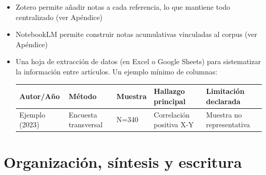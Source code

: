 \documentclass[
]{book}
\newcounter{none} %
\begin{document}
\begin{itemize}
\item
  Zotero permite añadir notas a cada referencia, lo que mantiene todo centralizado (ver Apéndice)
\item
  NotebookLM permite construir notas acumulativas vinculadas al corpus (ver Apéndice)
\item
  Una hoja de extracción de datos (en Excel o Google Sheets) para sistematizar la información entre artículos. Un ejemplo mínimo de columnas:

  {\def\LTcaptype{none} %
  \begin{longtable}[]{@{}
    >{\raggedright\arraybackslash}p{}
    >{\raggedright\arraybackslash}p{}
    >{\raggedright\arraybackslash}p{}
    >{\raggedright\arraybackslash}p{}
    >{\raggedright\arraybackslash}p{}@{}}
  \toprule\noalign{}
  \begin{minipage}[b]{\linewidth}\raggedright
  Autor/Año
  \end{minipage} & \begin{minipage}[b]{\linewidth}\raggedright
  Método
  \end{minipage} & \begin{minipage}[b]{\linewidth}\raggedright
  Muestra
  \end{minipage} & \begin{minipage}[b]{\linewidth}\raggedright
  Hallazgo principal
  \end{minipage} & \begin{minipage}[b]{\linewidth}\raggedright
  Limitación declarada
  \end{minipage} \\
  \midrule\noalign{}
  \endhead
  \bottomrule\noalign{}
  \endlastfoot
  Ejemplo (2023) & Encuesta transversal & N=340 & Correlación positiva X-Y & Muestra no representativa \\
  \end{longtable}
  }
\end{itemize}

\chapter{Organización, síntesis y escritura}\label{organizaciuxf3n-suxedntesis-y-escritura}
\end{document}
